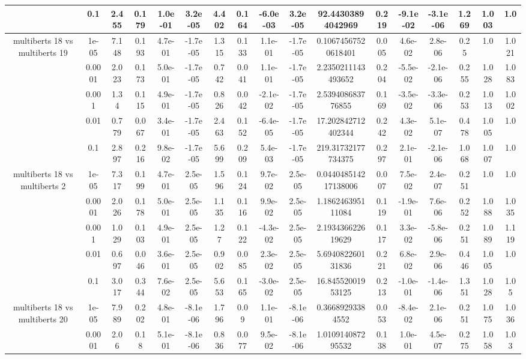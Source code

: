 \begin{tabular}{|c|c|c|c|c|c|c|c|c|c|c|c|c|c|c|c|c|}
 & 0.1 & 2.455 & 0.179 & 1.0e-01 & 3.2e-05 & 4.402 & 0.164 & -6.0e-03 & 3.2e-05 & 92.44303894042969 & 0.219 & -9.1e-02 & -3.1e-06 & 1.269 & 1.003 & 1.0 \\
\hline
\multirow{5}{*}{multiberts 18 vs multiberts 19} & 1e-05 & 7.148 & 0.193 & 4.7e-01 & -1.7e-05 & 1.315 & 0.133 & 1.1e-01 & -1.7e-05 & 0.10674567520618401 & 0.005 & 4.6e-02 & 2.8e-06 & 0.25 & 1.0 & 1.021 \\
 & 0.0001 & 2.023 & 0.173 & 5.0e-01 & -1.7e-05 & 0.742 & 0.041 & 1.1e-01 & -1.7e-05 & 2.2350211143493652 & 0.204 & -5.5e-02 & -2.1e-06 & 0.255 & 1.028 & 1.083 \\
 & 0.001 & 1.34 & 0.115 & 4.9e-01 & -1.7e-05 & 0.826 & 0.042 & -2.1e-02 & -1.7e-05 & 2.539408683776855 & 0.169 & -3.5e-02 & -3.3e-06 & 0.253 & 1.013 & 1.002 \\
 & 0.01 & 0.779 & 0.067 & 3.4e-01 & -1.7e-05 & 2.463 & 0.152 & -6.4e-05 & -1.7e-05 & 17.202842712402344 & 0.242 & 4.3e-02 & 5.1e-07 & 0.478 & 1.005 & 1.0 \\
 & 0.1 & 2.897 & 0.216 & 9.8e-02 & -1.7e-05 & 5.699 & 0.209 & 5.4e-03 & -1.7e-05 & 219.31732177734375 & 0.297 & 2.1e-01 & -2.1e-06 & 1.068 & 1.007 & 1.0 \\
\hline
\multirow{5}{*}{multiberts 18 vs multiberts 2} & 1e-05 & 7.317 & 0.199 & 4.7e-01 & 2.5e-05 & 1.596 & 0.124 & 9.7e-02 & 2.5e-05 & 0.044048514217138006 & 0.007 & 7.5e-02 & 2.4e-07 & 0.251 & 1.0 & 1.0 \\
 & 0.0001 & 2.026 & 0.178 & 5.0e-01 & 2.5e-05 & 1.135 & 0.116 & 9.9e-02 & 2.5e-05 & 1.186246395111084 & 0.119 & -1.9e-01 & 7.6e-06 & 0.252 & 1.088 & 1.035 \\
 & 0.001 & 1.029 & 0.103 & 4.9e-01 & 2.5e-05 & 1.27 & 0.122 & -4.3e-02 & 2.5e-05 & 2.193436622619629 & 0.117 & 3.3e-02 & -5.8e-06 & 0.251 & 1.089 & 1.119 \\
 & 0.01 & 0.697 & 0.046 & 3.6e-01 & 2.5e-05 & 0.902 & 0.085 & 2.3e-02 & 2.5e-05 & 5.694082260131836 & 0.221 & 6.8e-02 & 2.9e-06 & 0.446 & 1.005 & 1.0 \\
 & 0.1 & 3.017 & 0.344 & 7.6e-02 & 2.5e-05 & 5.653 & 0.165 & -3.0e-02 & 2.5e-05 & 16.84552001953125 & 0.213 & -1.0e-01 & -1.4e-06 & 1.351 & 1.028 & 1.05 \\
\hline
\multirow{5}{*}{multiberts 18 vs multiberts 20} & 1e-05 & 7.989 & 0.202 & 4.8e-01 & -8.1e-06 & 1.796 & 0.09 & 1.1e-01 & -8.1e-06 & 0.36689293384552 & 0.053 & -8.4e-02 & 2.1e-06 & 0.251 & 1.075 & 1.036 \\
 & 0.0001 & 2.06 & 0.18 & 5.1e-01 & -8.1e-06 & 0.836 & 0.077 & 9.5e-02 & -8.1e-06 & 1.010914087295532 & 0.138 & 1.0e-01 & 4.5e-07 & 0.275 & 1.058 & 1.03 \\

\end{tabular}
